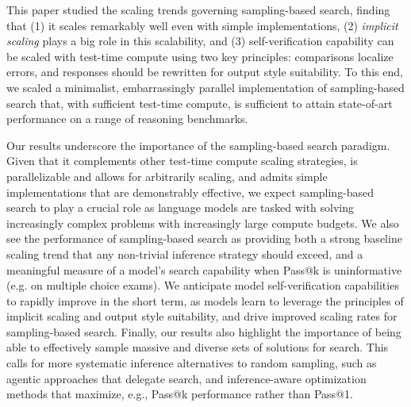 This paper studied the scaling trends governing sampling-based search, finding that (1) it scales remarkably well even with simple implementations, (2) \emph{implicit scaling} plays a big role in this scalability, and (3) self-verification capability can be scaled with test-time compute using two key principles: comparisons localize errors, and responses should be rewritten for output style suitability.
To this end, we scaled a minimalist, embarrassingly parallel implementation of sampling-based search that, with sufficient test-time compute, is sufficient to attain state-of-art performance on a range of reasoning benchmarks.

Our results underscore the importance of the sampling-based search paradigm. 
Given that it complements other test-time compute scaling strategies, is parallelizable and allows for arbitrarily scaling, and admits simple implementations that are demonstrably effective, we expect sampling-based search to play a crucial role as language models are tasked with solving increasingly complex problems with increasingly large compute budgets.
We also see the performance of sampling-based search as providing both a strong baseline scaling trend that any non-trivial inference strategy should exceed, and a meaningful measure of a model's search capability when Pass@k is uninformative (e.g. on multiple choice exams).
We anticipate model self-verification capabilities to rapidly improve in the short term, as models learn to leverage the principles of implicit scaling and output style suitability, and drive improved scaling rates for sampling-based search.
Finally, our results also highlight the importance of being able to effectively sample massive and diverse sets of solutions for search.
This calls for more systematic inference alternatives to random sampling, such as agentic approaches that delegate search, and inference-aware optimization methods that maximize, e.g., Pass@k performance rather than Pass@1.
